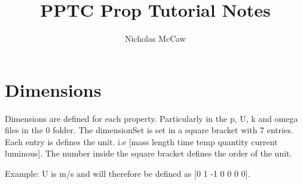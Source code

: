 \documentclass{article}
\title{PPTC Prop Tutorial Notes}
\author{Nicholas McCaw}
\begin{document}
	\maketitle
	\section{Dimensions}
	Dimensions are defined for each property. Particularly in the p, U, k and omega files in the 0 folder. The dimensionSet is set in a square bracket with 7 entries. Each entry is defines the unit. i.e [mass length time temp quantity current luminous]. The number inside the square bracket defines the order of the unit.
	
	Example: U is m/s and will therefore be defined as [0 1 -1 0 0 0 0].
	
\end{document}
